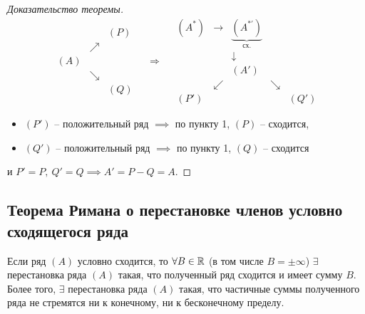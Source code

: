 \begin{proof}[Доказательство теоремы]
    \[
        \begin{array}{ccc}
                &          & (P) \\
                & \nearrow &     \\
            (A) &          &     \\
                & \searrow &     \\
                &          & (Q)
        \end{array} \quad \Longrightarrow \quad \begin{array}{ccccc}
            (A^*) & \rightarrow & \underbrace{(A^{*'})}_{\text{сх.}} &          &      \\
                  &             & \downarrow                         &          &      \\
                  &             & (A')                               &          &      \\
                  & \swarrow    &                                    & \searrow &      \\
            (P')  &             &                                    &          & (Q')
        \end{array}
    \]

    \begin{itemize}
        \item $(P')$ -- положительный ряд $\implies$ по пункту 1, $(P)$ -- сходится,
        \item $(Q')$ -- положительный ряд $\implies$ по пункту 1, $(Q)$ -- сходится
    \end{itemize}
    и $P' = P, \ Q' = Q \implies A' = P - Q = A$.
\end{proof}

\subsection{Теорема Римана о перестановке членов условно сходящегося ряда}

\begin{theorem}
    Если ряд $(A)$ условно сходится, то $\forall B \in \mathbb{R}$ (в том числе $B = \pm\infty$) $\exists$ перестановка ряда $(A)$ такая, что полученный ряд сходится и имеет сумму $B$. Более того, $\exists$ перестановка ряда $(A)$ такая, что частичные суммы полученного ряда не стремятся ни к конечному, ни к бесконечному пределу.
\end{theorem}

